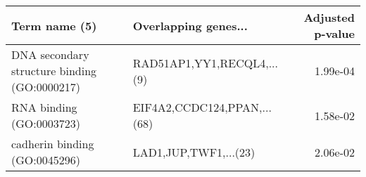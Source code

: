 \begin{tabular}{llr}
\toprule
                               Term name (5) &        Overlapping genes... &  Adjusted p-value \\
\midrule
DNA secondary structure binding (GO:0000217) &  RAD51AP1,YY1,RECQL4,...(9) &          1.99e-04 \\
                    RNA binding (GO:0003723) & EIF4A2,CCDC124,PPAN,...(68) &          1.58e-02 \\
               cadherin binding (GO:0045296) &       LAD1,JUP,TWF1,...(23) &          2.06e-02 \\
\bottomrule
\end{tabular}
